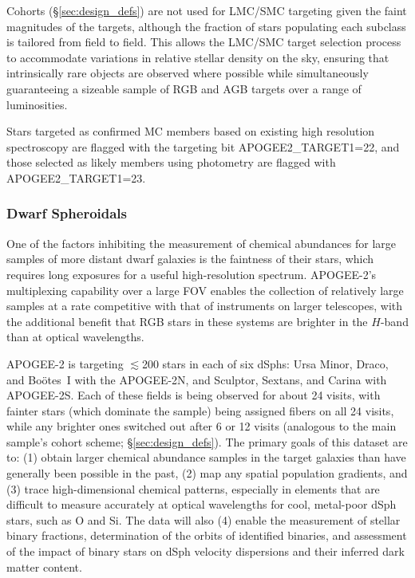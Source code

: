 \documentclass[12pt,twocolumn]{emulateapj}
\begin{document}
Cohorts (\S\ref{sec:design_defs}) are not used for LMC/SMC targeting given the faint magnitudes of the targets, although the fraction of stars populating each subclass is tailored from field to field.  This allows the LMC/SMC target selection process to accommodate variations in relative stellar density on the sky, ensuring that intrinsically rare objects are observed where possible while simultaneously guaranteeing a sizeable sample of RGB and AGB targets over a range of luminosities.

Stars targeted as confirmed MC members based on existing high resolution spectroscopy are flagged with the targeting bit APOGEE2\_TARGET1=22, and those selected as likely members using photometry are flagged with APOGEE2\_TARGET1=23.

\subsubsection{Dwarf Spheroidals}
\label{sec:dsphs}

One of the factors inhibiting the measurement of chemical abundances for large samples of more distant dwarf galaxies is the faintness of their stars, which requires long exposures for a useful high-resolution spectrum.  APOGEE-2's multiplexing capability over a large FOV enables the collection of relatively large samples at a rate competitive with that of instruments on larger telescopes,
with the additional benefit that RGB stars in these systems are brighter in the $H$-band than at optical wavelengths.

APOGEE-2 is targeting $\lesssim$200 stars in each of six dSphs: Ursa Minor, Draco, and Bo\"{o}tes~I with the APOGEE-2N, and Sculptor, Sextans, and Carina with APOGEE-2S.  Each of these fields is being observed for about 24 visits, with fainter stars (which dominate the sample) being assigned fibers on all 24 visits, while any brighter ones switched out after 6 or 12 visits (analogous to the main sample's cohort scheme; \S\ref{sec:design_defs}).  The primary goals of this dataset are to: (1) obtain larger chemical abundance samples in the target galaxies than have generally been possible in the past, (2) map any spatial population gradients, and (3) trace high-dimensional chemical patterns, especially in elements that are difficult to measure accurately at optical wavelengths for cool, metal-poor dSph stars, such as O and Si.  The data will also (4) enable the measurement of stellar binary fractions, determination of the orbits of identified binaries, and assessment of the impact of binary stars on dSph velocity dispersions and their inferred dark matter content.
\end{document}
